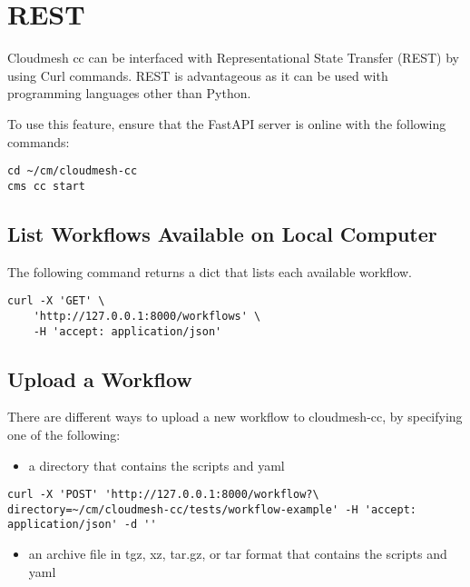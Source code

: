 \section{REST}\label{rest}

Cloudmesh cc can be interfaced with Representational State Transfer
(REST) by using Curl commands. REST is advantageous as it can be used
with programming languages other than Python.

To use this feature, ensure that the FastAPI server is online with the
following commands:

\begin{verbatim}
cd ~/cm/cloudmesh-cc
cms cc start
\end{verbatim}

\subsection{List Workflows Available on Local
Computer}\label{list-workflows-available-on-local-computer}

The following command returns a dict that lists each available workflow.

\begin{verbatim}
curl -X 'GET' \
    'http://127.0.0.1:8000/workflows' \
    -H 'accept: application/json'
\end{verbatim}

\subsection{Upload a Workflow}\label{upload-a-workflow}

There are different ways to upload a new workflow to cloudmesh-cc, by
specifying one of the following:

\bigbreak
\begin{itemize}
\item
  a directory that contains the scripts and yaml
\end{itemize}

\begin{verbatim}
curl -X 'POST' 'http://127.0.0.1:8000/workflow?\
directory=~/cm/cloudmesh-cc/tests/workflow-example' -H 'accept: application/json' -d ''
\end{verbatim}
\bigbreak

\bigbreak
\begin{itemize}
\item
  an archive file in tgz, xz, tar.gz, or tar format that contains the
  scripts and yaml
\end{itemize}

